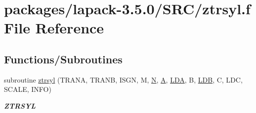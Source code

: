 \hypertarget{ztrsyl_8f}{}\section{packages/lapack-\/3.5.0/\+S\+R\+C/ztrsyl.f File Reference}
\label{ztrsyl_8f}
\subsection*{Functions/\+Subroutines}
\begin{DoxyCompactItemize}
\item 
subroutine \hyperlink{group__complex16SYcomputational_gace9164ad7a010073cc79b65ec75580cd}{ztrsyl} (T\+R\+A\+N\+A, T\+R\+A\+N\+B, I\+S\+G\+N, M, \hyperlink{polmisc_8c_a0240ac851181b84ac374872dc5434ee4}{N}, \hyperlink{classA}{A}, \hyperlink{example__user_8c_ae946da542ce0db94dced19b2ecefd1aa}{L\+D\+A}, B, \hyperlink{example__user_8c_a50e90a7104df172b5a89a06c47fcca04}{L\+D\+B}, C, L\+D\+C, S\+C\+A\+L\+E, I\+N\+F\+O)
\begin{DoxyCompactList}\small\item\em {\bfseries Z\+T\+R\+S\+Y\+L} \end{DoxyCompactList}\end{DoxyCompactItemize}
